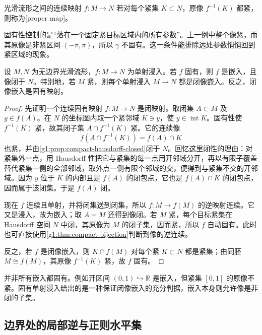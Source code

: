 \begin{definition}\label{g1:def:proper-map-manifolds}
	光滑流形之间的连续映射 \(f:M\to N\) 若对每个紧集 \(K\subset N\)，原像 \(f^{-1}(K)\) 都紧，则称为[proper map]。
\end{definition}

固有性控制的是“落在一个固定紧目标区域内的所有参数”。上一例中整个像紧，而其原像是非紧区间 \((-\pi,\pi)\)，所以 \(\gamma\) 不固有。这一条件能排除远处参数悄悄回到紧区域的现象。

\begin{proposition}\label{g1:prop:proper-injective-immersion}
	设 \(M,N\) 为无边界光滑流形，\(f:M\to N\) 为单射浸入。若 \(f\) 固有，则 \(f\) 是嵌入，且像闭于 \(N\)。特别地，若 \(M\) 紧，则每个单射浸入 \(M\to N\) 都是闭像嵌入。反之，闭像嵌入是固有映射。
\end{proposition}
\begin{proof}
	先证明一个连续固有映射 \(f:M\to N\) 是闭映射。取闭集 \(A\subset M\) 及 \(y\in\overline{f(A)}\)。在 \(N\) 的坐标图内取一个紧邻域 \(K\ni y\)，使 \(y\in\operatorname{int}K\)。固有性使 \(f^{-1}(K)\) 紧，故其闭子集 \(A\cap f^{-1}(K)\) 紧。它的连续像
	\[
		f(A\cap f^{-1}(K))=f(A)\cap K
	\]
	也紧，并由\cref{g1:prop:compact-hausdorff-closed}闭于 \(N\)。回忆这里闭性的理由：对紧集外一点，用 Hausdorff 性把它与紧集的每一点用开邻域分开，再以有限子覆盖替代紧集一侧的全部邻域，取外点一侧有限个邻域的交，便得到与紧集不交的开邻域。因为 \(y\) 位于 \(K\) 的内部且是 \(f(A)\) 的闭包点，它也是 \(f(A)\cap K\) 的闭包点，因而属于该闭集。于是 \(f(A)\) 闭。

	现在 \(f\) 连续且单射，并将闭集送到闭集，所以 \(f:M\to f(M)\) 的逆映射连续。它又是浸入，故为嵌入；取 \(A=M\) 还得到像闭。若 \(M\) 紧，每个目标紧集在 Hausdorff 空间 \(N\) 中闭，其原像为 \(M\) 的闭子集，因而紧，所以 \(f\) 自动固有。此时也可直接使用\cref{g1:thm:compact-bijection}判断到像的逆连续。

	反之，若 \(f\) 是闭像嵌入，则 \(K\cap f(M)\) 对每个紧 \(K\subset N\) 都是紧集；由同胚 \(M\cong f(M)\)，其原像 \(f^{-1}(K)\) 紧，故 \(f\) 固有。
\end{proof}

并非所有嵌入都固有。例如开区间 \((0,1)\hookrightarrow\mathbb R\) 是嵌入，但紧集 \([0,1]\) 的原像不紧。固有单射浸入给出的是一种保证闭像嵌入的充分判据，嵌入本身则允许像是非闭的子集。

\subsection{边界处的局部逆与正则水平集}
\label{g1:subsec:1104:05}

